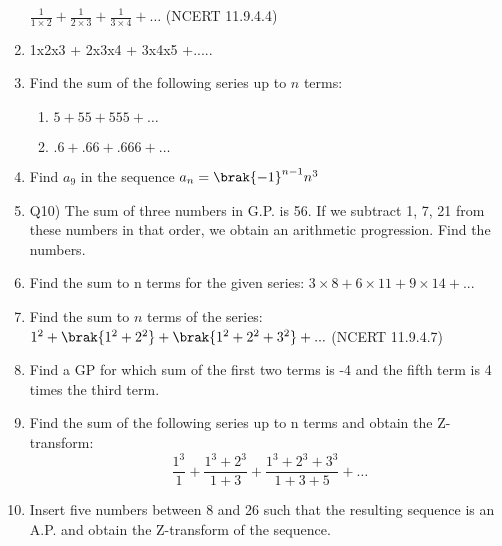 \begin{enumerate}[label=\thesection.\arabic*,ref=\thesection.\theenumi]
$\frac{1}{1 \times 2} + \frac{1}{2 \times 3} + \frac{1}{3 \times 4} + \ldots$ \hfill(NCERT 11.9.4.4)\\
\solution
 
\pagebreak
\item 1x2x3 + 2x3x4 + 3x4x5 +..... \\
\solution
\pagebreak
\item  Find the sum of the following series up to \(n\) terms:
          \begin{enumerate}
              \item $5 + 55 + 555 + \ldots$
              \item  $.6 + .66 + .666 + \ldots$
        \end{enumerate}

\solution

\pagebreak
\item Find $a_{9}$ in the sequence $a_{n}=\brak{-1}^{n-1}n^{3}$ \\
\solution
\pagebreak


\item Q10) The sum of three numbers in G.P. is 56. If we subtract 1, 7, 21 from these numbers in that order, we obtain an arithmetic progression. Find the numbers.\\
\solution 
\pagebreak
\item  Find the sum to n terms for the given series: $3\times8 + 6\times11 + 9\times14 + ...$ \\
\solution 

\pagebreak
\item Find the sum to $n$ terms of the series:\\
$1^2+\brak{1^2+2^2}+\brak{1^2+2^2+3^2}+...$ \hfill(NCERT 11.9.4.7)\\
\solution

\pagebreak
\item Find a GP for which sum of the first two terms is -4 and the fifth term is 4 times the third term.\\
\solution

\pagebreak

\item Find the sum of the following series up to n terms and obtain the Z-transform: 
$$\frac{1^3}{1} + \frac{1^3 + 2^3}{1 + 3} + \frac{1^3 + 2^3 + 3^3}{1 + 3 + 5} + \ldots$$
\solution

\pagebreak
\item Insert five numbers between 8 and 26 such that the resulting sequence is an A.P. and obtain the Z-transform of the sequence. \\
\solution

\pagebreak


\end{enumerate}
